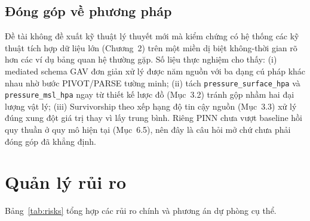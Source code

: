 \documentclass[12pt,a4paper]{report}
\begin{document}
\section{Đóng góp về phương pháp}
\label{sec:contributions}

Đề tài không đề xuất kỹ thuật lý thuyết mới mà kiểm chứng có hệ thống các kỹ thuật tích hợp dữ liệu
lớn (Chương~2) trên một miền dị biệt không-thời gian rõ hơn các ví dụ bảng quan hệ thường gặp. Số liệu
thực nghiệm cho thấy: (i) mediated schema GAV đơn giản xử lý được năm nguồn với ba dạng cú pháp khác
nhau nhờ bước PIVOT/PARSE tường minh; (ii) tách \texttt{pressure\_surface\_hpa} và
\texttt{pressure\_msl\_hpa} ngay từ thiết kế lược đồ (Mục~3.2) tránh gộp nhầm hai đại lượng vật lý;
(iii) Survivorship theo xếp hạng độ tin cậy nguồn (Mục~3.3) xử lý đúng xung đột giá trị thay vì lấy
trung bình. Riêng PINN chưa vượt baseline hồi quy thuần ở quy mô hiện tại (Mục~6.5), nên đây là câu
hỏi mở chứ chưa phải đóng góp đã khẳng định.

\chapter{Quản lý rủi ro}

Bảng~\ref{tab:risks} tổng hợp các rủi ro chính và phương án dự phòng cụ thể.
\end{document}
